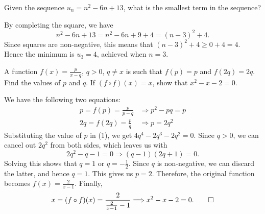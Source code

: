 \begin{question}
    Given the sequence $u_{n} = n^2 - 6n + 13$, what is the smallest term in
    the sequence? 
\end{question}
\begin{solution}
    By completing the square, we have
    \[n^2 - 6n + 13 = n^2 - 6n + 9 + 4 = (n - 3)^2 + 4.\]
    Since squares are non-negative, this means that $(n - 3)^2 + 4 \geq 0 + 4 =
    4$. Hence the minimum is $u_3 = 4$, achieved when $n = 3$. 
\end{solution}

\begin{question}
    A function $f(x) = \frac{p}{x - q}$, $q > 0$, $q \ne x$ is such that $f(p)
    = p$ and $f(2q) = 2q$. Find the values of $p$ and $q$. If $(f \circ f)(x) =
    x$, show that $x^2 - x - 2 = 0$.
\end{question}
\begin{solution}
    We have the following two equations:
    \begin{align}
        p = f(p) = \frac{p}{p - q} &\Longrightarrow p^2 - pq = p\\
        2q = f(2q) = \frac{p}{q} &\Longrightarrow p = 2q^2
    \end{align}
    Substituting the value of $p$ in (1), we get $4q^4 - 2q^3 - 2q^2 = 0.$ Since
    $q > 0$, we can cancel out $2q^2$ from both sides, which leaves us with 
    \[2q^2 - q - 1 = 0 \Longrightarrow (q - 1)(2q + 1) = 0.\] 
    Solving this shows that $q = 1$ or $q = -\frac{1}{2}$. Since $q$ is
    non-negative, we can discard the latter, and hence $q = 1$. This gives us
    $p = 2$. Therefore, the original function becomes $f(x) = \frac{2}{x - 1}$.
    Finally, 
    \[ x = (f \circ f)(x) = \frac{2}{\frac{2}{x - 1} - 1} \Longrightarrow x^2
    - x - 2 = 0. \qedhere \]
\end{solution}

